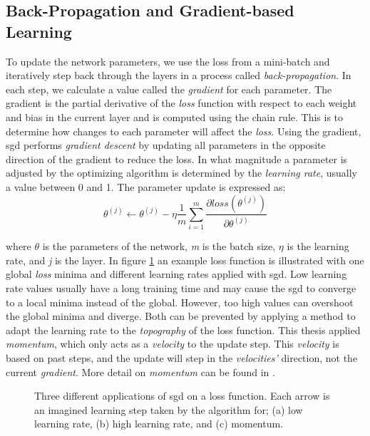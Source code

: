 \subsection{Back-Propagation and Gradient-based Learning}\label{backpropagation}
    To update the network parameters, we use the loss from a mini-batch and iteratively step back through the layers in a process called \textit{back-propagation}\cite{rumelhart1986learning_backprop}. In each step, we calculate a value called the \textit{gradient} for each parameter. The gradient is the partial derivative of the \textit{loss} function with respect to each weight and bias in the current layer and is computed using the chain rule. This is to determine how changes to each parameter will affect the \textit{loss}. Using the gradient, \gls{sgd} performs \textit{gradient descent}\cite{Goodfellow-et-al-2016} by updating all parameters in the opposite direction of the gradient to reduce the loss. In what magnitude a parameter is adjusted by the optimizing algorithm is determined by the \textit{learning rate}, usually a value between 0 and 1. The parameter update is expressed as\cite{pmlr-v37-ioffe15_batch_norm}:
    \begin{equation}
    \theta^{(j)} \leftarrow \theta^{(j)} - \eta \dfrac{1}{m}\sum_{i=1}^{m} \dfrac{\partial loss (\theta^{(j)})}{\partial \theta^{(j)}}
    \end{equation}
    
    where $\theta$ is the parameters of the network, \textit{m} is the batch size, $\eta$ is the learning rate, and \textit{j} is the layer. In figure \ref{learning_rates} an example loss function is illustrated with one global \textit{loss} minima and different learning rates applied with \gls{sgd}. Low learning rate values usually have a long training time and may cause the \gls{sgd} to converge to a local minima instead of the global\cite{farsal2018deep}. However, too high values can overshoot the global minima and diverge. Both can be prevented by applying a method to adapt the learning rate to the \textit{topography} of the loss function. This thesis applied \textit{momentum}, which only acts as a \textit{velocity} to the update step. This \textit{velocity} is based on past steps, and the update will step in the \textit{velocities'} direction, not the current \textit{gradient}. More detail on \textit{momentum} can be found in \citeauthor{pmlr-v28-sutskever13}\cite{pmlr-v28-sutskever13}.
    
    \begin{figure}[H]
        \centering

        
        \caption[Learning rates]{Three different applications of \gls{sgd} on a loss function. Each arrow is an imagined learning step taken by the algorithm for; (a) low learning rate, (b) high learning rate, and (c) momentum.}
      	\medskip 
        \label{learning_rates}
    \end{figure}

